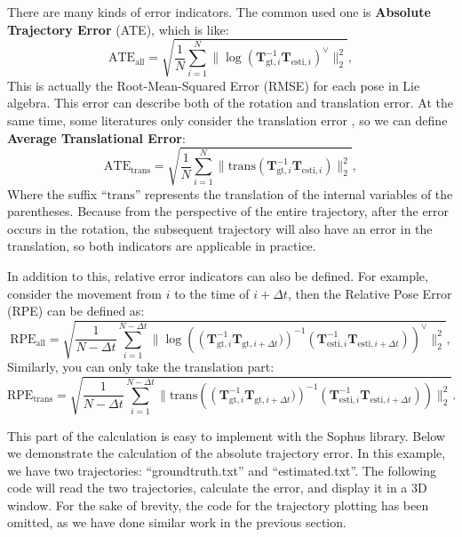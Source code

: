 There are many kinds of error indicators. The common used one is \textbf{Absolute Trajectory Error} (ATE), which is like:
\begin{equation}
\mathrm{ATE}_{\mathrm{all}} = \sqrt{ \frac{1}{N} \sum_{i=1}^N \| \log( \mathbf{T}_{\mathrm{gt },i}^{-1} \mathbf{T}_{\mathrm{esti},i} )^{\vee} \|_2^2},
\end{equation}
This is actually the Root-Mean-Squared Error (RMSE) for each pose in Lie algebra. This error can describe both of the rotation and translation error. At the same time, some literatures only consider the translation error \cite{Sturm2012}, so we can define \textbf{Average Translational Error}:
\begin{equation}
\mathrm{ATE}_{\mathrm{trans}} = \sqrt{ \frac{1}{N} \sum_{i=1}^N \| \mathrm{trans}( \mathbf{T}_{\mathrm{gt},i}^{-1} \mathbf{T}_{\mathrm{esti},i} ) \|_2^2},
\end{equation}
Where the suffix ``$\mathrm{trans}$'' represents the translation of the internal variables of the parentheses. Because from the perspective of the entire trajectory, after the error occurs in the rotation, the subsequent trajectory will also have an error in the translation, so both indicators are applicable in practice.

In addition to this, relative error indicators can also be defined. For example, consider the movement from $i$ to the time of $i+\Delta t$, then the Relative Pose Error (RPE) can be defined as:
\begin{equation}
\mathrm{RPE}_{\mathrm{all}} = \sqrt{ \frac{1}{N-\Delta t} \sum_{i=1}^{N-\Delta t} \| \log \left ( \left(\mathbf{T}_{\mathrm{gt},i}^{-1} \mathbf{T}_{\mathrm{gt},i+\Delta t} )\right)^{-1 } \left(\mathbf{T}_{\mathrm{esti},i}^{-1} \mathbf{T}_{\mathrm{esti},i+\Delta t}\right)\right)^{ \vee} \|_2^2},
\end{equation}
Similarly, you can only take the translation part:
\begin{equation}
\mathrm{RPE}_{\mathrm{trans}} = \sqrt{ \frac{1}{N-\Delta t} \sum_{i=1}^{N-\Delta t} \| \mathrm{trans } \left( \left(\mathbf{T}_{\mathrm{gt},i}^{-1} \mathbf{T}_{\mathrm{gt},i+\Delta t} )\right)^ {-1} \left(\mathbf{T}_{\mathrm{esti},i}^{-1} \mathbf{T}_{\mathrm{esti},i+\Delta t}\right)\right ) \|_2^2}.
\end{equation}

This part of the calculation is easy to implement with the Sophus library. Below we demonstrate the calculation of the absolute trajectory error. In this example, we have two trajectories: ``groundtruth.txt'' and ``estimated.txt''. The following code will read the two trajectories, calculate the error, and display it in a 3D window. For the sake of brevity, the code for the trajectory plotting has been omitted, as we have done similar work in the previous section.
    
